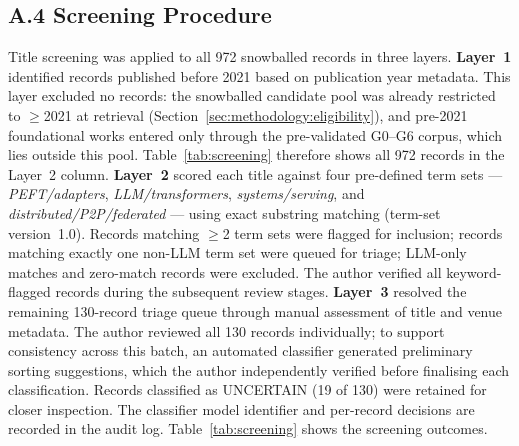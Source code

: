\subsection*{A.4 Screening Procedure}

Title screening was applied to all 972 snowballed records in three layers.
\textbf{Layer~1} identified records published before 2021 based on publication
year metadata. This layer excluded no records: the snowballed candidate pool
was already restricted to $\geq$2021 at retrieval
(Section~\ref{sec:methodology:eligibility}), and pre-2021 foundational works
entered only through the pre-validated G0--G6 corpus, which lies outside this
pool. Table~\ref{tab:screening} therefore shows all 972 records in the
Layer~2 column. \textbf{Layer~2} scored each title against four pre-defined
term sets --- \textit{PEFT/adapters}, \textit{LLM/transformers},
\textit{systems/serving}, and \textit{distributed/P2P/federated} --- using
exact substring matching (term-set version~1.0). Records matching $\geq$2
term sets were flagged for inclusion; records matching exactly one non-LLM
term set were queued for triage; LLM-only matches and zero-match records were
excluded. The author verified all keyword-flagged records during the
subsequent review stages. \textbf{Layer~3} resolved the remaining 130-record
triage queue through manual assessment of title and venue metadata. The author
reviewed all 130 records individually; to support consistency across this
batch, an automated classifier generated preliminary sorting suggestions,
which the author independently verified before finalising each
classification. Records classified as UNCERTAIN (19 of 130) were retained for
closer inspection. The classifier model identifier and per-record decisions
are recorded in the audit log. Table~\ref{tab:screening} shows the screening
outcomes.

